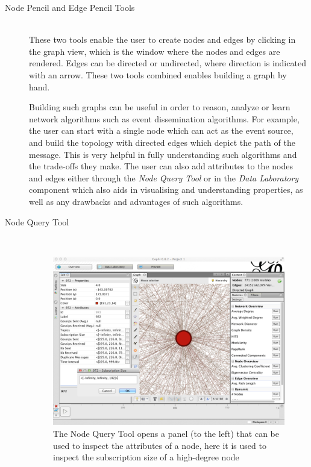 \begin{description}

\item[Node Pencil and Edge Pencil Tools] \hfill \\

    These two tools enable the user to create nodes and edges by
    clicking in the graph view, which is the window where the nodes and
    edges are rendered. Edges can be directed or undirected,
    where direction is indicated with an arrow. These two tools combined
    enables building a graph by hand.

    Building such graphs can be useful in order to reason, analyze or
    learn network algorithms such as event dissemination algorithms.
    For example, the user can start with a single node which can act as
    the event source, and build the topology with directed edges which
    depict the path of the message. This is very helpful in fully
    understanding such algorithms and the trade-offs they make. The user
    can also add attributes to the nodes and edges either through the
    \emph{Node Query Tool} or in the \emph{Data Laboratory} component
    which also aids in visualising and understanding properties,
    as well as any drawbacks and advantages of such algorithms.

\item[Node Query Tool] \hfill \\

    \begin{figure}[h!]
        \centering
        \includegraphics[width=\linewidth]{figures/gui_node_query}
        \caption{The Node Query Tool opens a panel (to the left) that can be used to inspect the
            attributes of a node, here it is used to inspect the
            subscription size of a high-degree node}
        \label{fig:gui_node_query}
    \end{figure}


\end{description}
